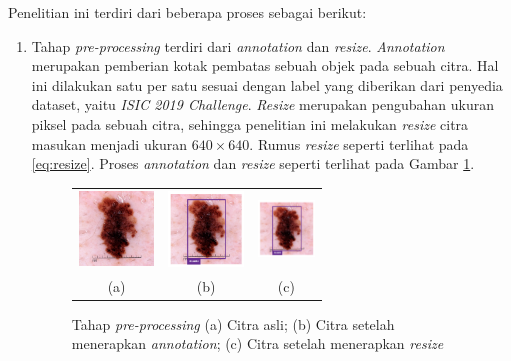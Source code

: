 Penelitian ini terdiri dari beberapa proses sebagai berikut:
\begin{enumerate}
    \item Tahap \textit{pre-processing} terdiri dari \textit{annotation} dan \textit{resize}. \textit{Annotation} merupakan pemberian kotak pembatas sebuah objek pada sebuah citra. Hal ini dilakukan satu per satu sesuai dengan label yang diberikan dari penyedia dataset, yaitu \textit{ISIC 2019 Challenge}. \textit{Resize} merupakan pengubahan ukuran piksel pada sebuah citra, sehingga penelitian ini melakukan \textit{resize} citra masukan menjadi ukuran $640\times 640$. Rumus \textit{resize} seperti terlihat pada \ref{eq:resize}. Proses \textit{annotation} dan \textit{resize} seperti terlihat pada Gambar \ref{fig:preprocessing}.
    \begin{figure}[H]
        \centering
        \begin{tabular}{ccc}
            \includegraphics[width=2cm]{../img/Dermoscopy - Latex.jpg}
            &
            \includegraphics[width=2cm]{../img/Annotation - Latex.png}
            &
            \includegraphics[width=1.5cm]{../img/Annotation - Latex.png}\\
            (a) &(b) &(c)\\
        \end{tabular}
        \caption{Tahap \textit{pre-processing} (a) Citra asli; (b) Citra setelah menerapkan \textit{annotation}; (c) Citra setelah menerapkan \textit{resize}}
        \label{fig:preprocessing}
    \end{figure}


\end{enumerate}
